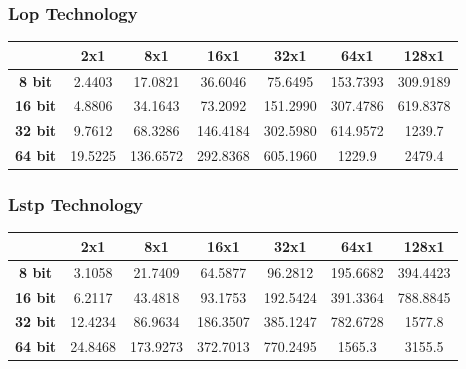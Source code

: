 \subsubsection{Lop Technology}
\begin{tabular}{|c|c|c|c|c|c|c|}
	\hline
	& \bfseries2x1 & \bfseries8x1 & \bfseries16x1 & \bfseries32x1 & \bfseries64x1 & \bfseries128x1 \\
	\hline
	\hline
	\bfseries8 bit&2.4403&17.0821&36.6046&75.6495&153.7393&309.9189 \\
	\hline
	\bfseries16 bit&4.8806&34.1643&73.2092&151.2990&307.4786&619.8378\\
	\hline
	\bfseries32 bit&9.7612&68.3286&146.4184&302.5980&614.9572&1239.7\\
	\hline
	\bfseries64 bit&19.5225&136.6572&292.8368&605.1960&1229.9&2479.4\\
	\hline
\end{tabular} 
\subsubsection{Lstp Technology}
\begin{tabular}{|c|c|c|c|c|c|c|}
	\hline
	& \bfseries2x1 & \bfseries8x1 & \bfseries16x1 & \bfseries32x1 & \bfseries64x1 & \bfseries128x1 \\
	\hline
	\hline
	\bfseries8 bit&3.1058&21.7409&64.5877&96.2812&195.6682&394.4423 \\
	\hline
	\bfseries16 bit&6.2117&43.4818&93.1753&192.5424&391.3364&788.8845\\
	\hline
	\bfseries32 bit&12.4234&86.9634&186.3507&385.1247&782.6728&1577.8 \\
	\hline
	\bfseries64 bit&24.8468&173.9273&372.7013&770.2495&1565.3&3155.5\\
	\hline
\end{tabular} 

